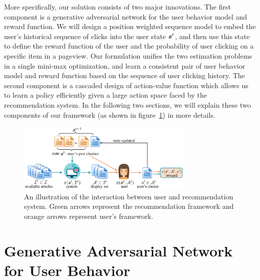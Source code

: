 \documentclass{article} %
\newcommand{\xc}[1]{{\color{blue}{\bf\sf [#1]}}}
\newcommand{\shuang}[1]{{\color{purple}{\bf\sf[ #1]}}}
\begin{document}

More specifically, our solution consists of two major innovations. The first component is a generative adversarial network for the user behavior model and reward function. We will design a position weighted sequence model to embed the user's historical sequence of clicks into the user state ${\bm{s}}^t$, and then use this state to define the reward function of the user and the probability of user clicking on a specific item in a pageview. Our formulation unifies the two estimation problems in a single mini-max optimization, and learn a consistent pair of user behavior model and reward function based on the sequence of user clicking history. The second component is a cascaded design of action-value function which allows us to learn a policy efficiently given a large action space faced by the recommendation system. In the following two sections, we will explain these two components of our framework (as shown in figure~\ref{fig:overall_framework}) in more details. 

\begin{figure}[h]
    \vspace{-4mm}
    \centering
    \includegraphics[width=0.75\textwidth]{overallfigure.pdf}
    \vspace{-3mm}
    \caption{An illustration of the interaction between user and recommendation system. Green arrows represent the recommendation framework and orange arrows represent user's framework.
    }
    \label{fig:overall_framework}
    \vspace{-3mm}
\end{figure}{}

\vspace{-3mm}
\section{Generative Adversarial Network for User Behavior}
\vspace{-3mm}
\end{document}
